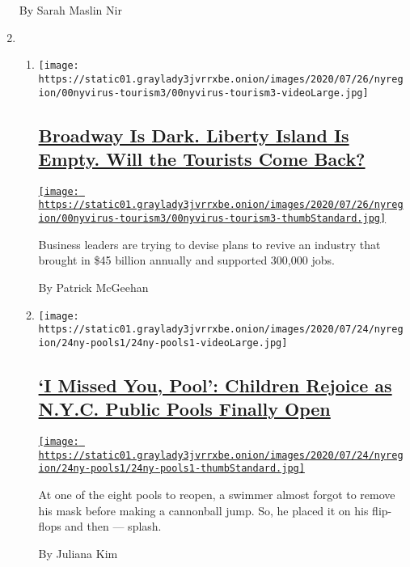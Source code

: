 \begin{enumerate}
  By Sarah Maslin Nir
\item
  \begin{enumerate}
  \def\labelenumii{\arabic{enumii}.}
  \item
    \texttt{[image: https://static01.graylady3jvrrxbe.onion/images/2020/07/26/nyregion/00nyvirus-tourism3/00nyvirus-tourism3-videoLarge.jpg]}

    \hypertarget{broadway-is-dark-liberty-island-is-empty-will-the-tourists-come-back}{%
    \subsection{\texorpdfstring{\href{/2020/07/24/nyregion/nyc-tourism-coronavirus.html}{Broadway
    Is Dark. Liberty Island Is Empty. Will the Tourists Come
    Back?}}{Broadway Is Dark. Liberty Island Is Empty. Will the Tourists Come Back?}}\label{broadway-is-dark-liberty-island-is-empty-will-the-tourists-come-back}}

    \href{/2020/07/24/nyregion/nyc-tourism-coronavirus.html}{\texttt{[image: https://static01.graylady3jvrrxbe.onion/images/2020/07/26/nyregion/00nyvirus-tourism3/00nyvirus-tourism3-thumbStandard.jpg]}}

    Business leaders are trying to devise plans to revive an industry
    that brought in \$45 billion annually and supported 300,000 jobs.

    By Patrick McGeehan
  \item
    \texttt{[image: https://static01.graylady3jvrrxbe.onion/images/2020/07/24/nyregion/24ny-pools1/24ny-pools1-videoLarge.jpg]}

    \hypertarget{i-missed-you-pool-children-rejoice-as-nyc-public-pools-finally-open}{%
    \subsection{\texorpdfstring{\href{/2020/07/24/nyregion/nyc-pools-open.html}{`I
    Missed You, Pool': Children Rejoice as N.Y.C. Public Pools Finally
    Open}}{`I Missed You, Pool': Children Rejoice as N.Y.C. Public Pools Finally Open}}\label{i-missed-you-pool-children-rejoice-as-nyc-public-pools-finally-open}}

    \href{/2020/07/24/nyregion/nyc-pools-open.html}{\texttt{[image: https://static01.graylady3jvrrxbe.onion/images/2020/07/24/nyregion/24ny-pools1/24ny-pools1-thumbStandard.jpg]}}

    At one of the eight pools to reopen, a swimmer almost forgot to
    remove his mask before making a cannonball jump. So, he placed it on
    his flip-flops and then --- splash.

    By Juliana Kim
  \end{enumerate}
\end{enumerate}

